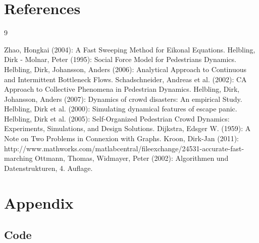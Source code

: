 \documentclass[11pt]{article}
\begin{document}
\section{References}

\begin{thebibliography} {9}
	
	 Zhao, Hongkai (2004): A Fast Sweeping Method for Eikonal Equations.
	 Helbling, Dirk - Molnar, Peter (1995): Social Force Model for Pedestrians Dynamics.
	 Helbling, Dirk, Johansson, Anders (2006): Analytical Approach to Continuous and Intermittent Bottleneck Flows.
	 Schadschneider, Andreas et al. (2002): CA Approach to Collective Phenomena in Pedestrian Dynamics.	
	 Helbling, Dirk, Johansson, Anders (2007): Dynamics of crowd disasters: An empirical Study.
	 Helbling, Dirk et al. (2000): Simulating dynamical features of escape panic.
	 Helbling, Dirk et al. (2005): Self-Organized Pedestrian Crowd Dynamics: Experiments, Simulations, and Design Solutions.
	 Dijkstra, Edsger W. (1959): A Note on Two Problems in Connexion with Graphs.
	 Kroon, Dirk-Jan (2011): http://www.mathworks.com/matlabcentral/fileexchange/24531-accurate-fast-marching
	 Ottmann, Thomas, Widmayer, Peter (2002): Algorithmen und Datenstrukturen, 4. Auflage.

\end{thebibliography}


\section{Appendix}

\subsection{Code}

\lstset{language=Matlab,breaklines=true}

















\end{document}
